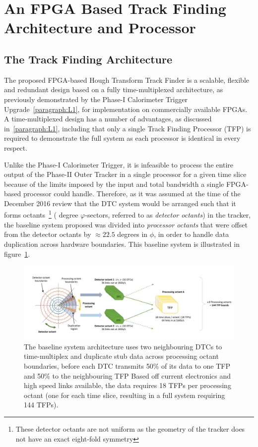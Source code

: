 \section{An FPGA Based Track Finding Architecture and Processor}\label{sec:TMTT}
\subsection{The Track Finding Architecture}\label{subsec:TFA}
The proposed FPGA-based Hough Transform Track Finder is a scalable, flexible and redundant design based on a fully time-multiplexed architecture, as previously demonstrated by the Phase-I Calorimeter Trigger Upgrade~\ref{paragraph:L1}, for implementation on commercially available FPGAs.
A time-multiplexed design has a number of advantages, as discussed in~\ref{paragraph:L1}, including that only a single Track Finding Processor (TFP) is required to demonstrate the full system as each processor is identical in every respect.

Unlike the Phase-I Calorimeter Trigger, it is infeasible to process the entire output of the Phase-II Outer Tracker in a single processor for a given time slice because of the limits imposed by the input and total bandwidth a single FPGA-based processor could handle.
Therefore, as it was assumed at the time of the December 2016 review that the DTC system would be arranged such that it forms octants~\footnote{These detector octants are not uniform as the geometry of the tracker does not have an exact eight-fold symmetry} ( degree $\varphi$-sectors, referred to as \emph {detector octants}) in the tracker, the baseline system proposed was divided into \emph{processor octants} that were offset from the detector octants by $\approx 22.5$ degrees in $\phi$, in order to handle data duplication across hardware boundaries.
This baseline system is illustrated in figure~\ref{fig:tmttarch}.

\begin{figure}[t]
\centering
\includegraphics[width=1.00\textwidth]{figs/tk-upgrade/tmttarch.pdf}
\caption{The baseline system architecture uses two neighbouring DTCs to time-multiplex and duplicate stub data across processing octant boundaries, before each DTC transmits 50\% of its data to one TFP and 50\% to the neighbouring TFP Based off current electronics and high speed links available, the data requires 18 TFPs per processing octant (one for each time slice, resulting in a full system requiring 144 TFPs).}
\label{fig:tmttarch}
\end{figure}

